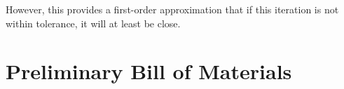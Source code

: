 \documentclass[12pt, letterpaper]{report}%
\newcounter{mycounter}           %
\newcounter{sub}[mycounter]      %
\newcommand{\dDdXTol}{$0.1 \mu m$}
\newcommand{\dXdLTol}{$0.1 \mu m$ \todo{Fix dXdLTol def to exceed thermal expansion (2.4 $\mu m$) and compression (??) of valve stem}}
\newcommand{\todo}[1]{{\bfseries\color{red}[TODO: #1]}}
\begin{document}
        However, this provides a first-order approximation that if this iteration is not within tolerance, it will at least be close.
        

            


    
%
%
%

\chapter{Preliminary Bill of Materials}
\label{sec:bom}

\end{document}
